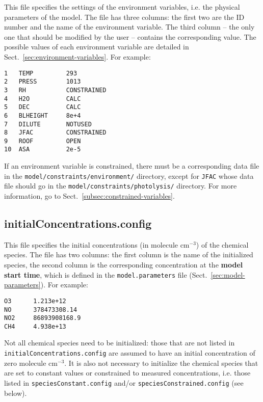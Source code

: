 This file specifies the settings of the environment variables, i.e.
the physical parameters of the model. The file has three columns: the
first two are the ID number and the name of the environment variable.
The third column -- the only one that should be modified by the
user -- contains the corresponding value. The possible values of each
environment variable are detailed in Sect.~\ref{sec:environment-variables}.
For example:

\begin{verbatim}
1   TEMP         293
2   PRESS        1013
3   RH           CONSTRAINED
4   H2O          CALC
5   DEC          CALC
6   BLHEIGHT     8e+4
7   DILUTE       NOTUSED
8   JFAC         CONSTRAINED
9   ROOF         OPEN
10  ASA          2e-5
\end{verbatim}

If an environment variable is constrained, there must be a
corresponding data file in the \texttt{model/constraints/environment/}
directory, except for \texttt{JFAC} whose data file should go in the
\texttt{model/constraints/photolysis/} directory. For more
information, go to Sect.~\ref{subsec:constrained-variables}.

\subsection{initialConcentrations.config} \label{subsec:initialconcentrations}

This file specifies the initial concentrations (in molecule cm$^{-3}$)
of the chemical species. The file has two columns: the first column is the
name of the initialized species, the second column is the corresponding
concentration at the \textbf{model start time}, which is defined
in the \texttt{model.parameters} file (Sect.~\ref{sec:model-parameters}).
For example:

\begin{verbatim}
O3      1.213e+12
NO      378473308.14
NO2     86893908168.9
CH4     4.938e+13
\end{verbatim}

Not all chemical species need to be initialized: those that are not
listed in \texttt{initialConcentrations.config} are assumed to have an
initial concentration of zero molecule cm$^{-3}$. It is also not
necessary to initialize the chemical species that are set to constant
values or constrained to measured concentrations, i.e. those listed in
\texttt{speciesConstant.config} and/or \texttt{speciesConstrained.config}
(see below).

